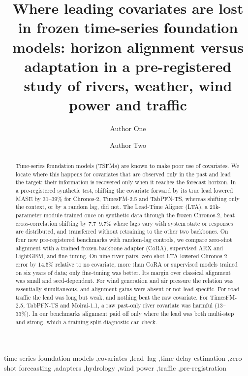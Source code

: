 \documentclass[preprint,11pt,authoryear]{elsarticle}
\newcommand{\lta}{\textsc{LTA}}
\begin{document}
\begin{frontmatter}
\title{Where leading covariates are lost in frozen time-series foundation models: horizon alignment versus adaptation in a pre-registered study of rivers, weather, wind power and traffic}

\author[1]{Author One}
\author[1]{Author Two}
\address[1]{Affiliation (to be completed)}

\begin{abstract}
Time-series foundation models (TSFMs) are known to make poor use of covariates. We locate where this happens for covariates that are observed only in the past and lead the target: their information is recovered only when it reaches the forecast horizon. In a pre-registered synthetic test, shifting the covariate forward by its true lead lowered MASE by 31--39\% for Chronos-2, TimesFM-2.5 and TabPFN-TS, whereas shifting only the context, or by a random lag, did not. The Lead-Time Aligner (\lta{}), a 21k-parameter module trained once on synthetic data through the frozen Chronos-2, beat cross-correlation shifting by 7.7--9.7\% where lags vary with system state or responses are distributed, and transferred without retraining to the other two backbones. On four new pre-registered benchmarks with random-lag controls, we compare zero-shot alignment with a trained frozen-backbone adapter (CoRA), supervised ARX and LightGBM, and fine-tuning. On nine river pairs, zero-shot \lta{} lowered Chronos-2 error by 14.5\% relative to no covariate, more than CoRA or supervised models trained on six years of data; only fine-tuning was better. Its margin over classical alignment was small and seed-dependent. For wind generation and air pressure the relation was essentially simultaneous, and alignment gains were absent or not lead-specific. For road traffic the lead was long but weak, and nothing beat the raw covariate. For TimesFM-2.5, TabPFN-TS and Moirai-1.1, a raw past-only river covariate was harmful (13--33\%). In our benchmarks alignment paid off only where the lead was both multi-step and strong, which a training-split diagnostic can check.
\end{abstract}

\begin{keyword}
time-series foundation models \sep covariates \sep lead--lag \sep time-delay estimation \sep zero-shot forecasting \sep adapters \sep hydrology \sep wind power \sep traffic \sep pre-registration
\end{keyword}
\end{frontmatter}
\end{document}
